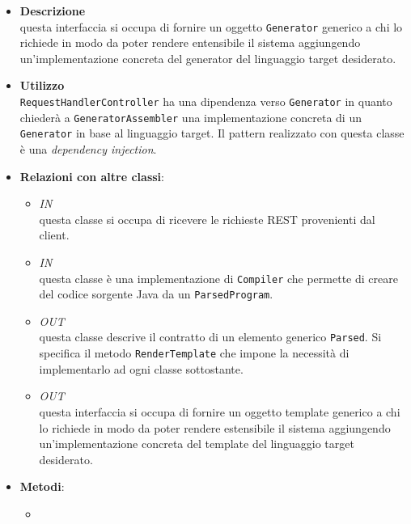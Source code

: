 \begin{itemize}
\item \textbf{Descrizione}\\
questa interfaccia si occupa di fornire un oggetto \texttt{Generator} generico a chi lo richiede in modo da poter rendere entensibile il sistema aggiungendo un'implementazione concreta del generator del linguaggio target desiderato.
\item \textbf{Utilizzo}\\
\texttt{RequestHandlerController} ha una dipendenza verso \texttt{Generator} in quanto chiederà a \texttt{GeneratorAssembler} una implementazione concreta di un \texttt{Generator} in base al linguaggio target. Il pattern realizzato con questa classe è una \emph{dependency injection}.
\item \textbf{Relazioni con altre classi}:
\begin{itemize}
\item \textit{IN} \hyperref[\nogloxy{swedesigner::server::controller::RequestHandlerController}]{}\\
questa classe si occupa di ricevere le richieste REST provenienti dal client.
\item \textit{IN} \hyperref[\nogloxy{swedesigner::server::generator::java::JavaGenerator}]{}\\
questa classe è una implementazione di \texttt{Compiler} che permette di creare del codice sorgente Java da un \texttt{ParsedProgram}.
\item \textit{OUT} \hyperref[\nogloxy{swedesigner::server::project::ParsedElement}]{}\\
questa classe descrive il contratto di un elemento generico \texttt{Parsed}. Si specifica il metodo \texttt{RenderTemplate} che impone la necessità di implementarlo ad ogni classe sottostante.
\item \textit{OUT} \hyperref[\nogloxy{swedesigner::server::template::Template}]{}\\
questa interfaccia si occupa di fornire un oggetto template generico a chi lo richiede in modo da poter rendere estensibile il sistema aggiungendo un'implementazione concreta del template del linguaggio target desiderato.
\end{itemize}
\item \textbf{Metodi}:
\begin{itemize}
\item {}

\end{itemize}
\end{itemize}
